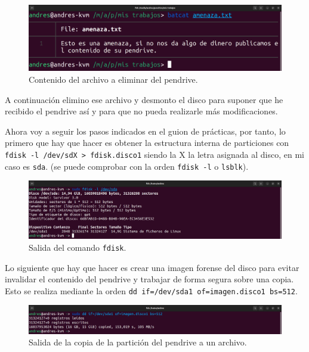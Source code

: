 \documentclass{article}
\begin{document}
\begin{figure}[H]
    \centering
    \includegraphics[width=\textwidth]{imagenes/Captura desde 2022-12-02 17-35-50.png}
    \caption{Contenido del archivo a eliminar del pendrive.}
\end{figure}

A continuación elimino ese archivo y desmonto el disco para suponer que he recibido el pendrive así y para que no pueda realizarle más modificaciones.

\newpage

Ahora voy a seguir los pasos indicados en el guion de prácticas, por tanto, lo primero que hay que hacer es obtener la estructura interna de particiones con \verb|fdisk -l /dev/sdX > fdisk.disco1| siendo la X la letra asignada al disco, en mi caso es \verb|sda|. (se puede comprobar con la orden \verb|fdisk -l| o \verb|lsblk|).

\begin{figure}[H]
    \centering
    \includegraphics[width=\textwidth]{imagenes/Captura desde 2022-12-03 21-28-00.png}
    \caption{Salida del comando \texttt{fdisk}.}
\end{figure}

Lo siguiente que hay que hacer es crear una imagen forense del disco para evitar invalidar el contenido del pendrive y trabajar de forma segura sobre una copia. Esto se realiza mediante la orden \verb|dd if=/dev/sda1 of=imagen.disco1 bs=512|.

\begin{figure}[H]
    \centering
    \includegraphics[width=\textwidth]{imagenes/Captura desde 2022-12-03 21-31-25.png}
    \caption{Salida de la copia de la partición del pendrive a un archivo.}
\end{figure}
\end{document}
